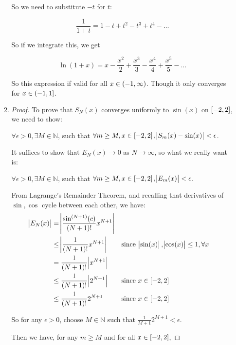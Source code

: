 \documentclass[12pt,letterpaper]{article}
\begin{document}
\begin{enumerate}
\begin{enumerate}
          So we need to substitute $-t$ for $t$:

          \[
            \frac{1}{1 + t} = 1 - t + t^2 - t^3 + t^4 - \dots
          \]

          So if we integrate this, we get

          \[
            \ln(1 + x) = x - \frac{x^2}{2} + \frac{x^3}{3} - \frac{x^4}{4} + \frac{x^5}{5} - \dots
          \]

          So this expression if valid for all $x \in \intoo{-1, \infty}$.
          Though it only converges for $x \in \intoc{-1, 1}$.
        \setcounter{enumii}{4}
        \item
          \begin{proof}
            To prove that $S_N(x)$ converges uniformly to $\sin(x)$ on $\intcc{-2, 2}$,
            we need to show:

            $\forall \epsilon > 0, \exists M \in \mathbb{N}$,
            such that $\forall m \geq M, x \in \intcc{-2, 2}, \envert{S_m(x) - \sin(x)} < \epsilon$.

            It suffices to show that $E_N(x) \to 0$ as $N \to \infty$,
            so what we really want is:

            $\forall \epsilon > 0, \exists M \in \mathbb{N}$,
            such that $\forall m \geq M, x \in \intcc{-2, 2}, \envert{E_m(x)} < \epsilon$.

            From Lagrange's Remainder Theorem, and recalling that derivatives of $\sin, \cos$ cycle between each other, we have:
            \begin{align*}
              \envert{E_N(x)} &= \envert{\frac{\sin^{(N + 1)}(c)}{(N + 1)!}x^{N + 1}} \\
              &\leq \envert{\frac{1}{(N + 1)!}x^{N + 1}} && \text{since } \envert{\sin(x)}, \envert{\cos(x)} \leq 1, \forall x \\
              &= \frac{1}{(N + 1)!}\envert{x^{N + 1}} \\
              &\leq \frac{1}{(N + 1)!}\envert{2^{N + 1}} && \text{since } x \in \intcc{-2, 2} \\
              &\leq \frac{1}{(N + 1)!}2^{N + 1} && \text{since } x \in \intcc{-2, 2} \\
            \end{align*}

            So for any $\epsilon > 0$, choose $M \in \mathbb{N}$ such that $\frac{1}{M + 1}2^{M + 1} < \epsilon$.

            Then we have, for any $m \geq M$ and for all $x \in \intcc{-2, 2}$,


\end{proof}
\end{enumerate}
\end{enumerate}
\end{document}
